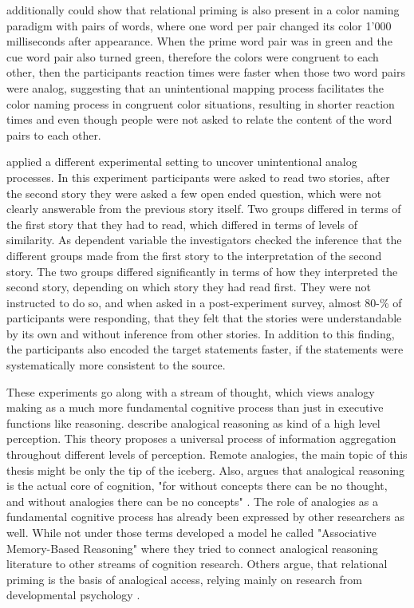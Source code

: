 \documentclass[a4paper,man,natbib,floatsintext,import]{apa6}
\begin{document}
\cite{Hristova2009b} additionally could show that relational priming is also present in a color naming paradigm with pairs of words, where one word per pair changed its color 1'000 milliseconds after appearance. When the prime word pair was in green and the cue word pair also turned green, therefore the colors were congruent to each other, then the participants reaction times were faster when those two word pairs were analog, suggesting that an unintentional mapping process facilitates the color naming process in congruent color situations, resulting in shorter reaction times and even though people were not asked to relate the content of the word pairs to each other.

\cite{Day2007} applied a different experimental setting to uncover unintentional analog processes. In this experiment participants were asked to read two stories, after the second story they were asked a few open ended question, which were not clearly answerable from the previous story itself. Two groups differed in terms of the first story that they had to read, which differed in terms of levels of similarity. As dependent variable the investigators checked the inference that the different groups made from the first story to the interpretation of the second story. The two groups differed significantly in terms of how they interpreted the second story, depending on which story they had read first. They were not instructed to do so, and when asked in a post-experiment survey, almost 80-\% of participants were responding, that they felt that the stories were understandable by its own and without inference from other stories. In addition to this finding, the participants also encoded the target statements faster, if the statements were systematically more consistent to the source.

These experiments go along with a stream of thought, which views analogy making as a much more fundamental cognitive process than just in executive functions like reasoning. \cite{Chalmers1992} describe analogical reasoning as kind of a high level perception. This theory proposes a universal process of information aggregation throughout different levels of perception. Remote analogies, the main topic of this thesis might be only the tip of the iceberg. Also, \cite{Hofstadter2001} argues that analogical reasoning is the actual core of cognition, "for without concepts there can be no thought, and without analogies there can be no concepts" \citep[p. 34]{Hofstadter2013}. The role of analogies as a fundamental cognitive process has already been expressed by other researchers as well. While not under those terms \cite{Kokinov1994} developed a model he called "Associative Memory-Based Reasoning" where they tried to connect analogical reasoning literature to other streams of cognition research. Others argue, that relational priming is the basis of analogical access, relying mainly on research from developmental psychology \citep{Leech2008}.
\end{document}
